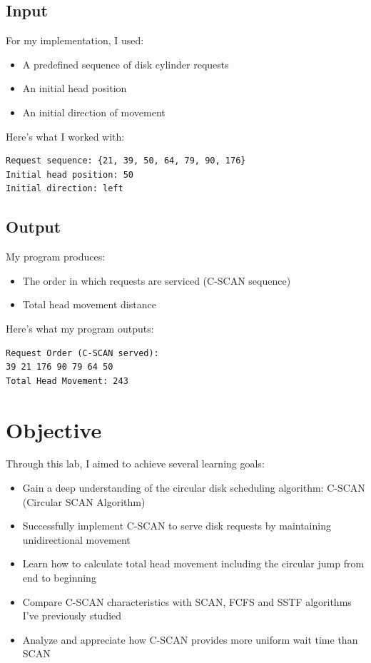 \documentclass[12pt,a4paper]{article}
\begin{document}
\subsection*{Input}
For my implementation, I used:
\begin{itemize}
  \item A predefined sequence of disk cylinder requests
  \item An initial head position
  \item An initial direction of movement
\end{itemize}

Here's what I worked with:
\begin{verbatim}
Request sequence: {21, 39, 50, 64, 79, 90, 176}
Initial head position: 50
Initial direction: left
\end{verbatim}

\subsection*{Output}
My program produces:
\begin{itemize}
  \item The order in which requests are serviced (C-SCAN sequence)
  \item Total head movement distance
\end{itemize}

Here's what my program outputs:
\begin{verbatim}
Request Order (C-SCAN served):
39 21 176 90 79 64 50
Total Head Movement: 243
\end{verbatim}

\section{Objective}
Through this lab, I aimed to achieve several learning goals:
\begin{itemize}
    \item Gain a deep understanding of the circular disk scheduling algorithm: C-SCAN (Circular SCAN Algorithm)
    \item Successfully implement C-SCAN to serve disk requests by maintaining unidirectional movement
    \item Learn how to calculate total head movement including the circular jump from end to beginning
    \item Compare C-SCAN characteristics with SCAN, FCFS and SSTF algorithms I've previously studied
    \item Analyze and appreciate how C-SCAN provides more uniform wait time than SCAN
\end{itemize}
\end{document}
